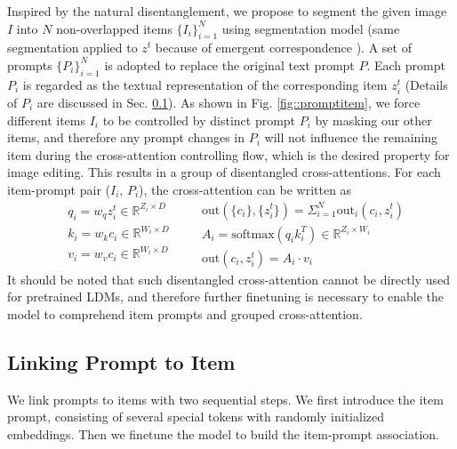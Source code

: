 Inspired by the natural disentanglement, we propose to segment the given image $I$ into $N$ non-overlapped items $\{I_i \}_{i=1}^{N}$ using segmentation model (same segmentation applied to $z^t$ because of emergent correspondence \cite{tang2023emergent}).
A set of prompts $\{ P_i\}_{i=1}^{N}$ is adopted to replace the original text prompt $P$.
Each prompt $P_i$ is regarded as the textual representation of the corresponding item $z^t_i$ (Details of $P_i$ are discussed in Sec. \ref{sec::item-prompt}).
As shown in Fig. \ref{fig::promptitem},
we force different items $I_i$ to be controlled by distinct prompt $P_i$ by masking our other items, and therefore any prompt changes in $P_i$ will not influence the remaining item during the cross-attention controlling flow, which is the desired property for image editing.
This results in a group of disentangled cross-attentions. For each item-prompt pair  ($I_i$, $P_i$), the cross-attention can be written as
\begin{equation}
\label{eq::dis_ca}
\begin{split}
    &q_i=w_q z^t_i \in \mathbb{R}^{Z_i\times D} \\ 
    &k_i = w_k c_i  \in \mathbb{R}^{W_i\times D} \\
    &v_i = w_v c_i \in \mathbb{R}^{W_i\times D}\\
\end{split}
\quad
\begin{split}
&\text{out}(\{ c_i\}, \{z^t_i\}) = \Sigma_{i=1}^{N} \text{out}_i(c_i, z^t_i)\\
    &A_i = \text{softmax}(q_ik_i^T) \in \mathbb{R}^{Z_i\times W_i} \\
    & \text{out}(c_i, z^t_i) = A_i\cdot v_i
\end{split}
\end{equation}
It should be noted that such disentangled cross-attention cannot be directly used for pretrained LDMs, and therefore further finetuning is necessary to enable the model to comprehend item prompts and grouped cross-attention. 

\subsection{Linking Prompt to Item}
\label{sec::item-prompt}
We link prompts to items with two sequential steps. 
We first introduce the item prompt, consisting of several special tokens with randomly initialized embeddings.
Then we finetune the model to build the item-prompt association.


